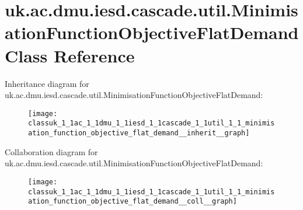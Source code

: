 \hypertarget{classuk_1_1ac_1_1dmu_1_1iesd_1_1cascade_1_1util_1_1_minimisation_function_objective_flat_demand}{\section{uk.\-ac.\-dmu.\-iesd.\-cascade.\-util.\-Minimisation\-Function\-Objective\-Flat\-Demand Class Reference}
\label{classuk_1_1ac_1_1dmu_1_1iesd_1_1cascade_1_1util_1_1_minimisation_function_objective_flat_demand}
}


Inheritance diagram for uk.\-ac.\-dmu.\-iesd.\-cascade.\-util.\-Minimisation\-Function\-Objective\-Flat\-Demand\-:\nopagebreak
\begin{figure}[H]
\begin{center}
\leavevmode
\texttt{[image: classuk\_1\_1ac\_1\_1dmu\_1\_1iesd\_1\_1cascade\_1\_1util\_1\_1\_minimisation\_function\_objective\_flat\_demand\_\_inherit\_\_graph]}
\end{center}
\end{figure}


Collaboration diagram for uk.\-ac.\-dmu.\-iesd.\-cascade.\-util.\-Minimisation\-Function\-Objective\-Flat\-Demand\-:\nopagebreak
\begin{figure}[H]
\begin{center}
\leavevmode
\texttt{[image: classuk\_1\_1ac\_1\_1dmu\_1\_1iesd\_1\_1cascade\_1\_1util\_1\_1\_minimisation\_function\_objective\_flat\_demand\_\_coll\_\_graph]}
\end{center}
\end{figure}

